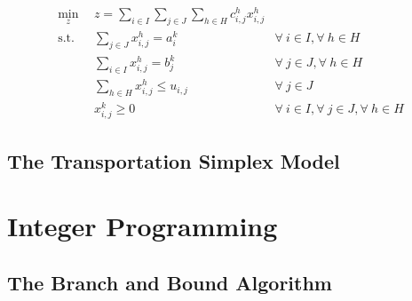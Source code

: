 \begin{subequations}\label{eqs:MCTP}
  \begin{align}
    \min_{z} \:\: & 
    z = \sum_{i \in I}\sum_{j \in J}\sum_{h \in H} c_{i,j}^{h} x_{i,j}^{h}
    & \label{eqs:MCTP_obj} \\
    \text{s.t.} \:\: &
    \sum_{j \in J} x_{i,j}^{h} = a_{i}^{k}
    &
    \forall \: i \in I, \forall \: h \in H \label{eqs:MCTP_sup} \\
    &
    \sum_{i \in I} x_{i,j}^{h} = b_{j}^{k}
    & 
    \forall \: j \in J, \forall \: h \in H \label{eqs:MCTP_dem} \\
    &
    \sum_{h \in H} x_{i,j}^{h} \leq u_{i,j}
    & 
    \forall \: j \in J \label{eqs:MCTP_cap} \\
    &
    x_{i,j}^{k} \geq 0
    &
    \forall \: i \in I, \forall \: j \in J, \forall \: h \in H \label{eqs:MCTP_x}
  \end{align}
\end{subequations}


\subsection{The Transportation Simplex Model}\label{sec:trans-simplex}

\section{Integer Programming}

\subsection{The Branch and Bound Algorithm}\label{sec:bnb}
